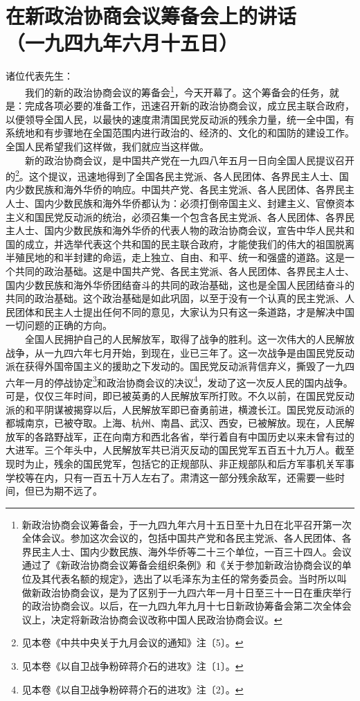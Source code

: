 \documentclass[cn,11pt,chinese]{elegantbook}
\def\myformat#1{\hfil\hfil #1}
\begin{document}
\newpage\section*{\myformat{在新政治协商会议筹备会上的讲话}\\\myformat{（一九四九年六月十五日）}}
诸位代表先生：\\
　　我们的新的政治协商会议的筹备会\footnote[1]{ 新政治协商会议筹备会，于一九四九年六月十五日至十九日在北平召开第一次全体会议。参加这次会议的，包括中国共产党和各民主党派、各人民团体、各界民主人士、国内少数民族、海外华侨等二十三个单位，一百三十四人。会议通过了《新政治协商会议筹备会组织条例》和《关于参加新政治协商会议的单位及其代表名额的规定》，选出了以毛泽东为主任的常务委员会。当时所以叫做新政治协商会议，是为了区别于一九四六年一月十日至三十一日在重庆举行的政治协商会议。以后，在一九四九年九月十七日新政协筹备会第二次全体会议上，决定将新政治协商会议改称中国人民政治协商会议。}，今天开幕了。这个筹备会的任务，就是：完成各项必要的准备工作，迅速召开新的政治协商会议，成立民主联合政府，以便领导全国人民，以最快的速度肃清国民党反动派的残余力量，统一全中国，有系统地和有步骤地在全国范围内进行政治的、经济的、文化的和国防的建设工作。全国人民希望我们这样做，我们就应当这样做。\\
　　新的政治协商会议，是中国共产党在一九四八年五月一日向全国人民提议召开的\footnote[2]{ 见本卷《中共中央关于九月会议的通知》注〔5〕。}。这个提议，迅速地得到了全国各民主党派、各人民团体、各界民主人士、国内少数民族和海外华侨的响应。中国共产党、各民主党派、各人民团体、各界民主人士、国内少数民族和海外华侨都认为：必须打倒帝国主义、封建主义、官僚资本主义和国民党反动派的统治，必须召集一个包含各民主党派、各人民团体、各界民主人士、国内少数民族和海外华侨的代表人物的政治协商会议，宣告中华人民共和国的成立，并选举代表这个共和国的民主联合政府，才能使我们的伟大的祖国脱离半殖民地的和半封建的命运，走上独立、自由、和平、统一和强盛的道路。这是一个共同的政治基础。这是中国共产党、各民主党派、各人民团体、各界民主人士、国内少数民族和海外华侨团结奋斗的共同的政治基础，这也是全国人民团结奋斗的共同的政治基础。这个政治基础是如此巩固，以至于没有一个认真的民主党派、人民团体和民主人士提出任何不同的意见，大家认为只有这一条道路，才是解决中国一切问题的正确的方向。\\
　　全国人民拥护自己的人民解放军，取得了战争的胜利。这一次伟大的人民解放战争，从一九四六年七月开始，到现在，业已三年了。这一次战争是由国民党反动派在获得外国帝国主义的援助之下发动的。国民党反动派背信弃义，撕毁了一九四六年一月的停战协定\footnote[3]{ 见本卷《以自卫战争粉碎蒋介石的进攻》注〔1〕。}和政治协商会议的决议\footnote[4]{ 见本卷《以自卫战争粉碎蒋介石的进攻》注〔2〕。}，发动了这一次反人民的国内战争。可是，仅仅三年时间，即已被英勇的人民解放军所打败。不久以前，在国民党反动派的和平阴谋被揭穿以后，人民解放军即已奋勇前进，横渡长江。国民党反动派的都城南京，已被夺取。上海、杭州、南昌、武汉、西安，已被解放。现在，人民解放军的各路野战军，正在向南方和西北各省，举行着自有中国历史以来未曾有过的大进军。三个年头中，人民解放军共已消灭反动的国民党军五百五十九万人。截至现时为止，残余的国民党军，包括它的正规部队、非正规部队和后方军事机关军事学校等在内，只有一百五十万人左右了。肃清这一部分残余敌军，还需要一些时间，但已为期不远了。\\
\end{document}
